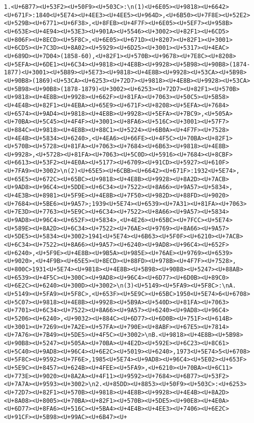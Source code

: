 \documentclass[
]{article}
\begin{document}
\begin{verbatim}
1.<U+6B77><U+53F2><U+50F9><U+503C>:\n(1)<U+6E05><U+9818><U+6642><U+671F>:1840<U+5E74><U+4EE3><U+4EE5><U+964D>,<U+6B50><U+7F8E><U+52E2><U+529B><U+6771><U+6F38>,<U+8FEB><U+4F7F><U+6E05><U+5EF7><U+958B><U+653E><U+4E94><U+53E3><U+901A><U+5546><U+3002><U+82F1><U+6CD5><U+806F><U+8ECD><U+5F8C>,<U+6E05><U+671D><U+8207><U+82F1><U+3001><U+6CD5><U+7C3D><U+8A02><U+5929><U+6D25><U+3001><U+5317><U+4EAC><U+689D><U+7D04>(1858-60),<U+82F1><U+570B><U+9678><U+7E8C><U+8208><U+5EFA><U+6DE1><U+6C34><U+9818><U+4E8B><U+9928><U+5B98><U+90B8>(1874-1877)<U+3001><U+5B89><U+5E73><U+9818><U+4E8B><U+9928><U+53CA><U+5B98><U+90B8>(1869)<U+53CA><U+6253><U+72D7><U+9818><U+4E8B><U+9928><U+53CA><U+5B98><U+90B8>(1878-1879)<U+3002><U+6253><U+72D7><U+82F1><U+570B><U+9818><U+4E8B><U+9928><U+662F><U+81FA><U+7063><U+50C5><U+5B58><U+4E4B><U+82F1><U+4EBA><U+65E9><U+671F><U+8208><U+5EFA><U+7684><U+6574><U+9AD4><U+9818><U+4E8B><U+9928><U+5EFA><U+7BC9>,<U+505A><U+70BA><U+5C45><U+4F4F><U+3001><U+8FA6><U+516C><U+3001><U+57F7><U+884C><U+9818><U+4E8B><U+88C1><U+5224><U+6B0A><U+4F7F><U+7528><U+4E4B><U+5834><U+6240>,<U+4EA6><U+66FE><U+4F5C><U+70BA><U+82F1><U+570B><U+5728><U+81FA><U+7063><U+7684><U+6B63><U+9818><U+4E8B><U+9928>,<U+5728><U+81FA><U+7063><U+5C0D><U+5916><U+7684><U+8CBF><U+6613><U+53F2><U+4E0A><U+5177><U+6709><U+91CD><U+5927><U+610F><U+7FA9><U+3002>\n(2)<U+65E5><U+6CBB><U+6642><U+671F>:1932<U+5E74>,<U+65E5><U+672C><U+65BC><U+9818><U+4E8B><U+9928><U+8A2D><U+7ACB><U+9AD8><U+96C4><U+5DDE><U+6C34><U+7522><U+8A66><U+9A57><U+5834>,<U+4E3B><U+8981><U+5F9E><U+4E8B><U+7F50><U+982D><U+88FD><U+9020><U+7684><U+5BE6><U+9A57>;1939<U+5E74><U+6539><U+7A31><U+81FA><U+7063><U+7E3D><U+7763><U+5E9C><U+6C34><U+7522><U+8A66><U+9A57><U+5834><U+9AD8><U+96C4><U+652F><U+5834>,<U+4E26><U+65BC><U+7FCC><U+5E74><U+589E><U+8A2D><U+6C34><U+7522><U+76AE><U+9769><U+8A66><U+9A57><U+5DE5><U+5834><U+3002>1941<U+5E74><U+6B63><U+5F0F><U+6210><U+7ACB><U+6C34><U+7522><U+8A66><U+9A57><U+6240><U+9AD8><U+96C4><U+652F><U+6240>,<U+5F9E><U+4E8B><U+9B5A><U+985E><U+76AE><U+9769><U+6539><U+9020>,<U+4F9B><U+65E5><U+8ECD><U+88FD><U+978B><U+4F7F><U+7528>,<U+800C>1931<U+5E74><U+9818><U+4E8B><U+5B98><U+90B8><U+5247><U+88AB><U+6539><U+4F5C><U+300C><U+9AD8><U+96C4><U+6D77><U+6D0B><U+89C0><U+6E2C><U+6240><U+300D><U+3002>\n(3)<U+5149><U+5FA9><U+5F8C>:\nA.<U+5149><U+5FA9><U+5F8C>,<U+653F><U+5E9C><U+65BC>1950<U+5E74>6<U+6708><U+5C07><U+9818><U+4E8B><U+9928><U+5B9A><U+540D><U+81FA><U+7063><U+7701><U+6C34><U+7522><U+8A66><U+9A57><U+6240><U+9AD8><U+96C4><U+5206><U+6240>,<U+9032><U+884C><U+6D77><U+6D0B><U+751F><U+614B><U+3001><U+7269><U+7A2E><U+57FA><U+790E><U+8ABF><U+67E5><U+7814><U+7A76><U+7B49><U+5DE5><U+4F5C><U+3002>\nB.<U+9818><U+4E8B><U+5B98><U+90B8><U+5247><U+505A><U+70BA><U+4E2D><U+592E><U+6C23><U+8C61><U+5C40><U+9AD8><U+96C4><U+6E2C><U+5019><U+6240>,1973<U+5E74>5<U+6708><U+5F8C><U+9592><U+7F6E>,1985<U+5E74><U+9AD8><U+96C4><U+5E02><U+653F><U+5E9C><U+8457><U+624B><U+4FEE><U+5FA9>,<U+6210><U+70BA><U+6C11><U+773E><U+9020><U+8A2A><U+4F11><U+9592><U+7684><U+6B77><U+53F2><U+7A7A><U+9593><U+3002>\n2.<U+85DD><U+8853><U+50F9><U+503C>:<U+6253><U+72D7><U+82F1><U+570B><U+9818><U+4E8B><U+9928><U+4E4B><U+8A2D><U+8A08><U+8005><U+70BA><U+82F1><U+570B><U+5DE5><U+90E8><U+4E0A><U+6D77><U+8FA6><U+516C><U+5BA4><U+4E4B><U+4EE3><U+7406><U+6E2C><U+91CF><U+5B98><U+99AC><U+6B47><U+
\end{verbatim}
\end{document}
